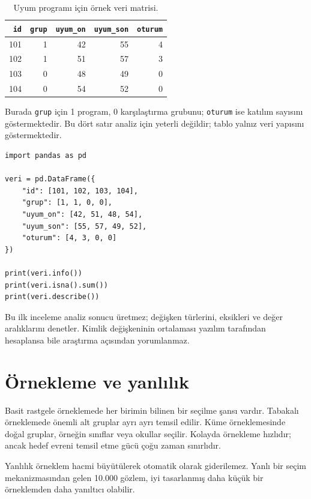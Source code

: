 \begin{table}[htbp]
\centering
\caption{Uyum programı için örnek veri matrisi.}
\begin{tabular}{@{}rrrrr@{}}
\toprule
\texttt{id} & \texttt{grup} & \texttt{uyum\_on} & \texttt{uyum\_son} & \texttt{oturum} \\
\midrule
101 & 1 & 42 & 55 & 4 \\
102 & 1 & 51 & 57 & 3 \\
103 & 0 & 48 & 49 & 0 \\
104 & 0 & 54 & 52 & 0 \\
\bottomrule
\end{tabular}
\end{table}

Burada \texttt{grup} için 1 program, 0 karşılaştırma grubunu; \texttt{oturum}
ise katılım sayısını göstermektedir. Bu dört satır analiz için yeterli değildir;
tablo yalnız veri yapısını göstermektedir.

\begin{lstlisting}
import pandas as pd

veri = pd.DataFrame({
    "id": [101, 102, 103, 104],
    "grup": [1, 1, 0, 0],
    "uyum_on": [42, 51, 48, 54],
    "uyum_son": [55, 57, 49, 52],
    "oturum": [4, 3, 0, 0]
})

print(veri.info())
print(veri.isna().sum())
print(veri.describe())
\end{lstlisting}

Bu ilk inceleme analiz sonucu üretmez; değişken türlerini, eksikleri ve değer
aralıklarını denetler. Kimlik değişkeninin ortalaması yazılım tarafından
hesaplansa bile araştırma açısından yorumlanmaz.

\section{Örnekleme ve yanlılık}

Basit rastgele örneklemede her birimin bilinen bir seçilme şansı vardır.
Tabakalı örneklemede önemli alt gruplar ayrı ayrı temsil edilir. Küme
örneklemesinde doğal gruplar, örneğin sınıflar veya okullar seçilir. Kolayda
örnekleme hızlıdır; ancak hedef evreni temsil etme gücü çoğu zaman sınırlıdır.

\begin{researchbox}
Yanlılık örneklem hacmi büyütülerek otomatik olarak giderilemez. Yanlı bir
seçim mekanizmasından gelen 10.000 gözlem, iyi tasarlanmış daha küçük bir
örneklemden daha yanıltıcı olabilir.
\end{researchbox}

